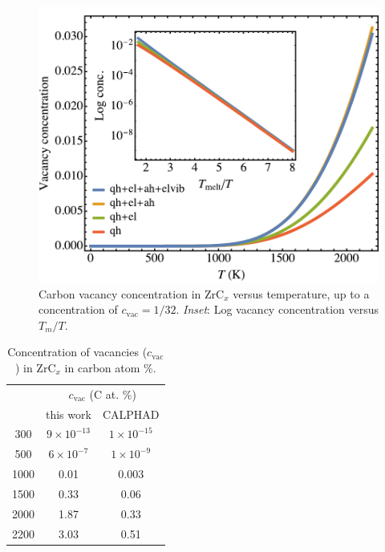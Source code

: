 \documentclass[twocolumn,american,aps,prb,showpacs,showkeys,amsmath,amssymb,superscriptaddress,a4]{revtex4-1}
\providecommand{\tabularnewline}{\\}
\begin{document}
\begin{figure}[h]
\begin{centering}
\includegraphics[scale=0.55]{Fig7_vacConcWithInset}
\par\end{centering}
\caption{\foreignlanguage{american}{Carbon vacancy concentration in ZrC\protect$_x$ versus
temperature, up to a concentration of $c_{\text{vac}}=1/32$. \emph{Inset}:
Log vacancy concentration versus $T_{m}/T$. \label{fig: vacConcWithInset}}}
\end{figure}

\begin{table}
\caption{\foreignlanguage{american}{Concentration of vacancies ($c_{\text{vac}}$) in ZrC\protect$_x$
in carbon atom \%. \label{tab: temperature-vacancyConc}}}

\centering{}%
\begin{tabular}{ccc}
\hline 
\noalign{\vskip\doublerulesep}
\multirow{2}{*}{$T$ (K) } & \multicolumn{2}{c}{$c_{\text{vac}}$ (C at. \%)}\tabularnewline[\doublerulesep]
\noalign{\vskip\doublerulesep}
 & this work & CALPHAD\cite{FernandezGuillermet1995}\tabularnewline[\doublerulesep]
\hline 
300 & $9\times10^{-13}$ & $1\times10^{-15}$\tabularnewline
500 & $6\times10^{-7}$ & $1\times10^{-9}$\tabularnewline
1000 & 0.01 & 0.003\tabularnewline
1500 & 0.33 & 0.06\tabularnewline
2000 & 1.87 & 0.33\tabularnewline
2200  & 3.03 & 0.51\tabularnewline
\hline 
\end{tabular}
\end{table}
\end{document}
